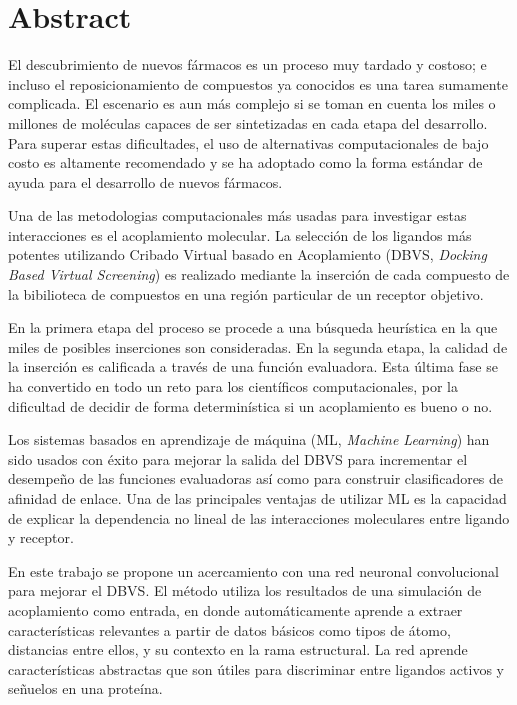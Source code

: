 \section{Abstract}
El descubrimiento de nuevos fármacos es un proceso muy tardado y
costoso; e incluso el reposicionamiento de compuestos ya conocidos es
una tarea sumamente complicada. El escenario es aun más complejo si
se toman en cuenta los miles o millones de moléculas capaces de ser
sintetizadas en cada etapa del desarrollo.  Para superar estas
dificultades, el uso de alternativas computacionales de bajo costo es
altamente recomendado y se ha adoptado como la forma estándar de
ayuda para el desarrollo de nuevos fármacos.

Una de las metodologias computacionales más usadas para investigar
estas interacciones es el acoplamiento molecular. La selección de los
ligandos más potentes utilizando Cribado Virtual basado en
Acoplamiento (DBVS, \textit{Docking Based Virtual Screening}) es
realizado mediante la inserción de cada compuesto de la bibilioteca de
compuestos en una región particular de un receptor objetivo.

En la primera etapa del proceso se procede a una búsqueda heurística
en la que miles de posibles inserciones son consideradas. En la
segunda etapa, la calidad de la inserción es calificada a través de
una función evaluadora. Esta última fase se ha convertido en todo un
reto para los científicos computacionales, por la dificultad de
decidir de forma determinística si un acoplamiento es bueno o no.

Los sistemas basados en aprendizaje de máquina (ML, \textit{Machine
  Learning}) han sido usados con éxito para mejorar la salida del DBVS
para incrementar el desempeño de las funciones evaluadoras así como
para construir clasificadores de afinidad de enlace. Una de las
principales ventajas de utilizar ML es la capacidad de explicar la
dependencia no lineal de las interacciones moleculares entre ligando y
receptor.

En este trabajo se propone un acercamiento con una red neuronal
convolucional para mejorar el DBVS. El método utiliza los resultados
de una simulación de acoplamiento como entrada, en donde
automáticamente aprende a extraer características relevantes a partir
de datos básicos como tipos de átomo, distancias entre ellos, y su
contexto en la rama estructural. La red aprende características
abstractas que son útiles para discriminar entre ligandos activos y
señuelos en una proteína.
